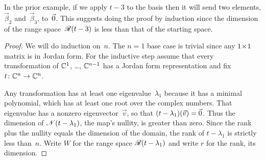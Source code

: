 In the prior example, if we apply
$t-3$ to the basis then it will send two elements, 
$\vec{\beta}_2$ and~$\vec{\beta}_3$, to~$\vec{0}$.
This suggests doing the proof by induction 
since the dimension of the range space~$\mathscr{R}(t-3)$
is less than that of the starting space.

\begin{proof}
%
We will do induction on~$n$.
The $n=1$ base case is trivial since any $1 \! \times \! 1$ matrix is in Jordan form.
For the inductive step assume that 
every transformation of $\mathbb{C}^1$, \ldots, $\mathbb{C}^{n-1}$ has a Jordan form
representation
and fix $\mbox{$t\colon \mathbb{C}^n\to \mathbb{C}^n$}$.

Any transformation has at least one eigenvalue~$\lambda_1$ because
it has a minimal polynomial, which
has at least one root over the complex numbers.
That eigenvalue has a nonzero 
eigenvector~$\vec{v}$, so that $(t-\lambda_1)(\vec{v})=\vec{0}$.
Thus the dimension of $\mathscr{N}(t-\lambda_1)$, the map's nullity,
is greater than zero.
Since the rank plus the nullity equals the dimension of the domain,
the rank of $t-\lambda_1$
is strictly less than~$n$.
Write $W$ for the range space $\mathscr{R}(t-\lambda_1)$ and write
$r$ for the rank, its dimension.


\end{proof}
